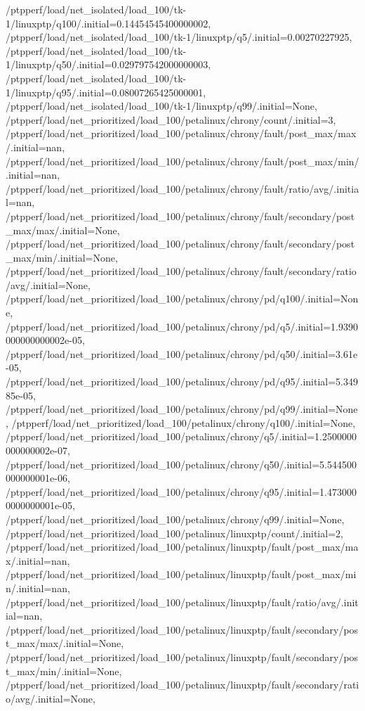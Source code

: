 {    /ptpperf/load/net_isolated/load_100/tk-1/linuxptp/q100/.initial=0.14454545400000002,
    /ptpperf/load/net_isolated/load_100/tk-1/linuxptp/q5/.initial=0.00270227925,
    /ptpperf/load/net_isolated/load_100/tk-1/linuxptp/q50/.initial=0.029797542000000003,
    /ptpperf/load/net_isolated/load_100/tk-1/linuxptp/q95/.initial=0.08007265425000001,
    /ptpperf/load/net_isolated/load_100/tk-1/linuxptp/q99/.initial=None,
    /ptpperf/load/net_prioritized/load_100/petalinux/chrony/count/.initial=3,
    /ptpperf/load/net_prioritized/load_100/petalinux/chrony/fault/post_max/max/.initial=nan,
    /ptpperf/load/net_prioritized/load_100/petalinux/chrony/fault/post_max/min/.initial=nan,
    /ptpperf/load/net_prioritized/load_100/petalinux/chrony/fault/ratio/avg/.initial=nan,
    /ptpperf/load/net_prioritized/load_100/petalinux/chrony/fault/secondary/post_max/max/.initial=None,
    /ptpperf/load/net_prioritized/load_100/petalinux/chrony/fault/secondary/post_max/min/.initial=None,
    /ptpperf/load/net_prioritized/load_100/petalinux/chrony/fault/secondary/ratio/avg/.initial=None,
    /ptpperf/load/net_prioritized/load_100/petalinux/chrony/pd/q100/.initial=None,
    /ptpperf/load/net_prioritized/load_100/petalinux/chrony/pd/q5/.initial=1.9390000000000002e-05,
    /ptpperf/load/net_prioritized/load_100/petalinux/chrony/pd/q50/.initial=3.61e-05,
    /ptpperf/load/net_prioritized/load_100/petalinux/chrony/pd/q95/.initial=5.34985e-05,
    /ptpperf/load/net_prioritized/load_100/petalinux/chrony/pd/q99/.initial=None,
    /ptpperf/load/net_prioritized/load_100/petalinux/chrony/q100/.initial=None,
    /ptpperf/load/net_prioritized/load_100/petalinux/chrony/q5/.initial=1.2500000000000002e-07,
    /ptpperf/load/net_prioritized/load_100/petalinux/chrony/q50/.initial=5.544500000000001e-06,
    /ptpperf/load/net_prioritized/load_100/petalinux/chrony/q95/.initial=1.4730000000000001e-05,
    /ptpperf/load/net_prioritized/load_100/petalinux/chrony/q99/.initial=None,
    /ptpperf/load/net_prioritized/load_100/petalinux/linuxptp/count/.initial=2,
    /ptpperf/load/net_prioritized/load_100/petalinux/linuxptp/fault/post_max/max/.initial=nan,
    /ptpperf/load/net_prioritized/load_100/petalinux/linuxptp/fault/post_max/min/.initial=nan,
    /ptpperf/load/net_prioritized/load_100/petalinux/linuxptp/fault/ratio/avg/.initial=nan,
    /ptpperf/load/net_prioritized/load_100/petalinux/linuxptp/fault/secondary/post_max/max/.initial=None,
    /ptpperf/load/net_prioritized/load_100/petalinux/linuxptp/fault/secondary/post_max/min/.initial=None,
    /ptpperf/load/net_prioritized/load_100/petalinux/linuxptp/fault/secondary/ratio/avg/.initial=None,
}
